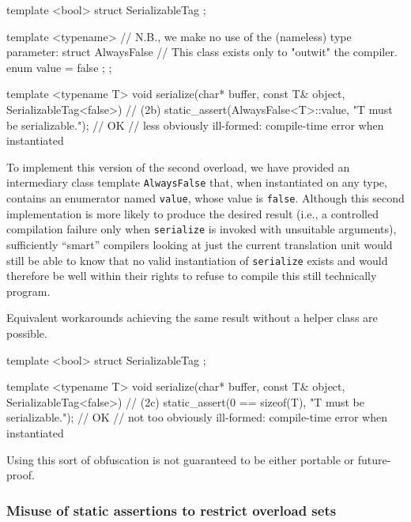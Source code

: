 \begin{emcppshiddenlisting}[emcppsbatch=e4]
template <bool>
struct SerializableTag { };
\end{emcppshiddenlisting}
\begin{emcppslisting}[emcppsbatch=e4]
template <typename>  // N.B., we make no use of the (nameless) type parameter:
struct AlwaysFalse   // This class exists only to "outwit" the compiler.
{
    enum { value = false };
};

template <typename T>
void serialize(char* buffer, const T& object, SerializableTag<false>)  // (2b)
{
    static_assert(AlwaysFalse<T>::value, "T must be serializable.");  // OK
        // less obviously ill-formed: compile-time error when instantiated
}
\end{emcppslisting}

\noindent To implement this version of the second overload, we have provided an
intermediary class template \lstinline!AlwaysFalse! that, when instantiated
on any type, contains an enumerator named \lstinline!value!, whose value is
\lstinline!false!. Although this second implementation is more likely to
produce the desired result (i.e., a controlled compilation failure
only when \lstinline!serialize! is invoked with unsuitable arguments),
sufficiently ``smart'' compilers looking at just the current translation
unit would still be able to know that no valid instantiation of
\lstinline!serialize! exists and would therefore be well within their
rights to refuse to compile this still technically 
program.

Equivalent workarounds achieving the same result without a
helper class are possible.

\begin{emcppshiddenlisting}[emcppsbatch=e5]
template <bool>
struct SerializableTag { };
\end{emcppshiddenlisting}
\begin{emcppslisting}[emcppsbatch=e5]
template <typename T>
void serialize(char* buffer, const T& object, SerializableTag<false>)  // (2c)
{
    static_assert(0 == sizeof(T), "T must be serializable.");  // OK
         // not too obviously ill-formed: compile-time error when instantiated
}
\end{emcppslisting}

\noindent Using this sort of obfuscation is not guaranteed to be either
portable or future-proof.

\subsubsection[Misuse of static assertions to restrict overload sets]{Misuse of static assertions to restrict overload sets}\label{misuse-of-static-assertions-to-restrict-overload-sets}

